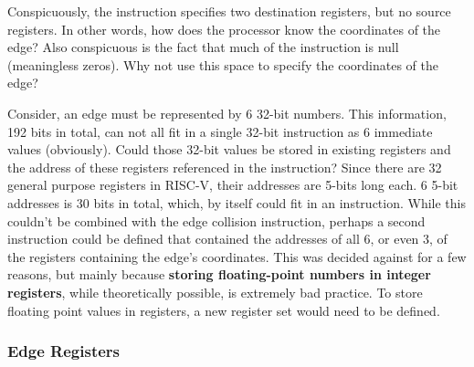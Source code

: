     Conspicuously, the instruction specifies two destination registers, but no source registers. In other words, how does the processor know the coordinates of the edge? Also conspicuous is the fact that much of the instruction is null (meaningless zeros). Why not use this space to specify the coordinates of the edge?

    Consider, an edge must be represented by 6 32-bit numbers. This information, 192 bits in total, can not all fit in a single 32-bit instruction as 6 immediate values (obviously). Could those 32-bit values be stored in existing registers and the address of these registers referenced in the instruction? Since there are 32 general purpose registers in RISC-V, their addresses are 5-bits long each. 6 5-bit addresses is 30 bits in total, which, by itself could fit in an instruction. While this couldn't be combined with the edge collision instruction, perhaps a second instruction could be defined that contained the addresses of all 6, or even 3, of the registers containing the edge's coordinates. This was decided against for a few reasons, but mainly because \textbf{storing floating-point numbers in integer registers}, while theoretically possible, is extremely bad practice. To store floating point values in registers, a new register set would need to be defined.

    \subsubsection{Edge Registers}
